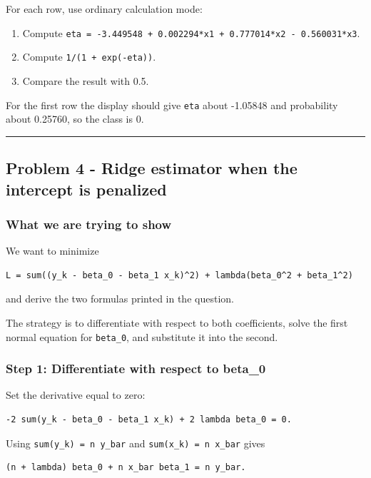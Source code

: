 ﻿\documentclass[11pt]{article}
\begin{document}
For each row, use ordinary calculation mode:

\begin{enumerate}
\item Compute \texttt{eta = -3.449548 + 0.002294*x1 + 0.777014*x2 - 0.560031*x3}.
\item Compute \texttt{1/(1 + exp(-eta))}.
\item Compare the result with 0.5.
\end{enumerate}

For the first row the display should give \texttt{eta} about -1.05848 and probability
about 0.25760, so the class is 0.

\medskip\hrule\medskip

\subsection{Problem 4 - Ridge estimator when the intercept is penalized}

\subsubsection{What we are trying to show}

We want to minimize

\begin{lstlisting}
L = sum((y_k - beta_0 - beta_1 x_k)^2) + lambda(beta_0^2 + beta_1^2)
\end{lstlisting}

and derive the two formulas printed in the question.

The strategy is to differentiate with respect to both coefficients, solve the
first normal equation for \texttt{beta\_0}, and substitute it into the second.

\subsubsection{Step 1: Differentiate with respect to beta\_0}

Set the derivative equal to zero:

\begin{lstlisting}
-2 sum(y_k - beta_0 - beta_1 x_k) + 2 lambda beta_0 = 0.
\end{lstlisting}

Using \texttt{sum(y\_k) = n y\_bar} and \texttt{sum(x\_k) = n x\_bar} gives

\begin{lstlisting}
(n + lambda) beta_0 + n x_bar beta_1 = n y_bar.
\end{lstlisting}
\end{document}

